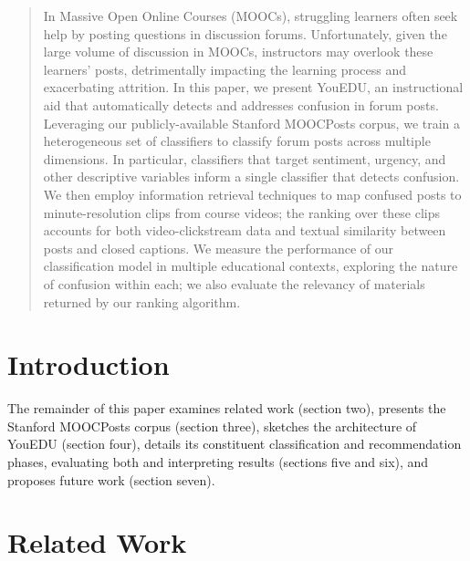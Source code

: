 \documentclass{edm_template}
\begin{document}
\maketitle
\begin{abstract}
In Massive Open Online Courses (MOOCs), struggling learners often seek help by
posting questions in discussion forums. Unfortunately, given the large volume of
discussion in MOOCs, instructors may overlook these learners' posts,
detrimentally impacting the learning process and exacerbating attrition. In this
paper, we present YouEDU, an instructional aid that automatically detects and
addresses confusion in forum posts. Leveraging our publicly-available Stanford
MOOCPosts corpus, we train a heterogeneous set of classifiers to classify forum
posts across multiple dimensions. In particular, classifiers that target
sentiment, urgency, and other descriptive variables inform a single classifier
that detects confusion. We then employ information retrieval techniques to map
confused posts to minute-resolution clips from course videos; the ranking over
these clips accounts for both video-clickstream data and textual similarity
between posts and closed captions. We measure the performance of our
classification model in multiple educational contexts, exploring the nature of
confusion within each; we also evaluate the relevancy of materials returned by
our ranking algorithm.
\end{abstract}

%


\section{Introduction}
The remainder of this paper examines related work (section two), presents the Stanford MOOCPosts corpus (section three), sketches the architecture of YouEDU (section four), details its constituent classification and recommendation phases, evaluating both and interpreting results (sections five and six), and proposes future work (section seven).

\section{Related Work}
\end{document}
